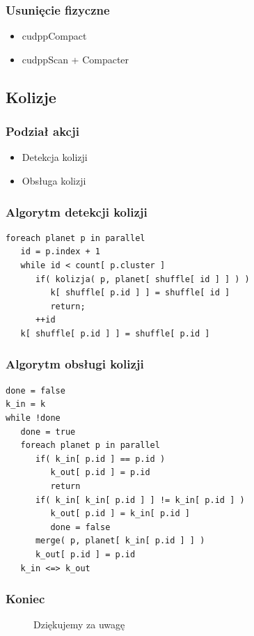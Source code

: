 \documentclass{beamer}
\begin{document}
\frame
{
	\frametitle{Usunięcie fizyczne}
	\begin{itemize}
	\item{cudppCompact}
	\item{cudppScan + Compacter}
	\end{itemize}
}

\subsection{Kolizje}

\frame
{
	\frametitle{Podział akcji}
	\begin{itemize}
		\item Detekcja kolizji
		\item Obsługa kolizji
	\end{itemize}
}

\begin{frame}[fragile]
	\frametitle{Algorytm detekcji kolizji}

	\begin{verbatim}
foreach planet p in parallel
   id = p.index + 1
   while id < count[ p.cluster ]
      if( kolizja( p, planet[ shuffle[ id ] ] ) )
         k[ shuffle[ p.id ] ] = shuffle[ id ]
         return;
      ++id
   k[ shuffle[ p.id ] ] = shuffle[ p.id ]
	\end{verbatim}
\end{frame}

\begin{frame}[fragile]
	\frametitle{Algorytm obsługi kolizji}
	\begin{verbatim}
done = false
k_in = k
while !done
   done = true
   foreach planet p in parallel   
      if( k_in[ p.id ] == p.id )
         k_out[ p.id ] = p.id
         return
      if( k_in[ k_in[ p.id ] ] != k_in[ p.id ] )
         k_out[ p.id ] = k_in[ p.id ]
         done = false
      merge( p, planet[ k_in[ p.id ] ] )
      k_out[ p.id ] = p.id
   k_in <=> k_out
   \end{verbatim}
\end{frame}

\frame
{
	\frametitle{Koniec}
	\begin{figure}
		\centering Dziękujemy za uwagę
	\end{figure}
	\setcounter{subfigure}{0}
}
\end{document}
